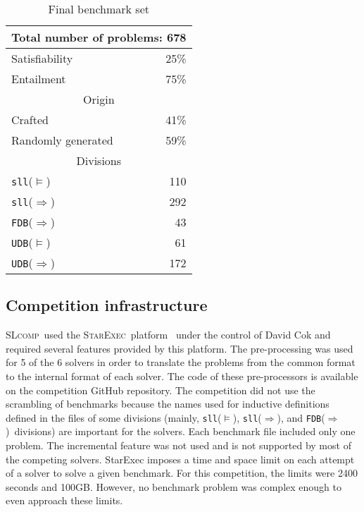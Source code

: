 \documentclass[twoside,11pt]{article}
\newcommand{\limp}{\Rightarrow}
\newcommand{\sllsat}{\texttt{sll}($\models$)}
\newcommand{\sllent}{\texttt{sll}($\limp$)}
\newcommand{\FDBent}{\texttt{FDB}($\limp$)}
\newcommand{\UDBsat}{\texttt{UDB}($\models$)}
\newcommand{\UDBent}{\texttt{UDB}($\limp$)}
\newcommand{\slcomp}{\textsc{SLcomp}}
\newcommand{\starexec}{\textsc{StarExec}}
\begin{document}
\begin{table}
\begin{center}
\begin{tabular}{p{6cm}r}\hline
\multicolumn{2}{c}{Total number of problems: 678} \\
\hline
Satisfiability & 25\% \\
Entailment & 75\% \\
\hline
%
\hline
\multicolumn{2}{c}{Origin} \\
\hline
Crafted & 41\% \\
Randomly generated & 59\% \\
\hline
%
\hline
\multicolumn{2}{c}{Divisions} \\
\hline
\sllsat & 110 \\ %
\sllent & 292 \\ %
\FDBent &  43 \\ %
\UDBsat &  61 \\ %
\UDBent & 172 \\
\hline
\end{tabular}
\end{center}
\caption{Final benchmark set}
\label{tab:bench}
\end{table}



\subsection{Competition infrastructure}

\slcomp\ used the \starexec\ platform~\cite{StarExecsite} under the control of David Cok 
and required several features provided by this platform.
%
The pre-processing was used for 5 of the 6 solvers in order to translate the problems from the common format to the internal format of each solver. The code of these pre-processors is available on the competition GitHub repository.
%
The competition did not use the scrambling of benchmarks because the names used for inductive definitions defined in the files of some divisions (mainly, \sllsat, \sllent, and \FDBent\ divisions) are important for the solvers.
%
Each benchmark file included only one problem. 
The incremental feature was not used and is not supported by most of the competing solvers.
%
StarExec imposes a time and space limit on each attempt of a solver to solve a given benchmark. For this competition, the limits were 2400 seconds and 100GB. However, no benchmark problem was complex enough to even approach these limits.
\end{document}
